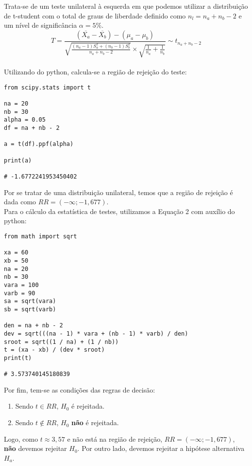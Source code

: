 Trata-se de um teste unilateral à esquerda em que podemos utilizar a distribuição de t-student com o total de graus de liberdade definido como $n_l=n_a+n_b-2$ e um nível de significância $\alpha=5\%$.\\

\begin{equation}
    T = \frac{(\overbar{X_a}-\overbar{X_b})-(\mu_a-\mu_b)}{
    \sqrt{\frac{(n_a-1)S^2_{a}+(n_b-1)S^2_{b}}{n_a+n_b-2}}
    \times
    \sqrt{\frac{1}{n_a}+\frac{1}{n_b}}
    }
    \sim t_{n_a+n_b-2}
\end{equation}
\\

Utilizando do python, calcula-se a região de rejeição do teste:
\\

\begin{lstlisting}
from scipy.stats import t

na = 20
nb = 30
alpha = 0.05
df = na + nb - 2
    
a = t(df).ppf(alpha)
    
print(a)
    
# -1.6772241953450402
\end{lstlisting}

Por se tratar de uma distribuição unilateral, temos que a região de rejeição é dada como $RR = (-\infty; -1,677)$.\\

Para o cálculo da estatística de testes, utilizamos a Equação 2 com auxílio do python:\\

\begin{lstlisting}
from math import sqrt

xa = 60
xb = 50
na = 20
nb = 30
vara = 100
varb = 90
sa = sqrt(vara)
sb = sqrt(varb)
    
den = na + nb - 2
dev = sqrt(((na - 1) * vara + (nb - 1) * varb) / den)
sroot = sqrt((1 / na) + (1 / nb))
t = (xa - xb) / (dev * sroot)
print(t)
    
# 3.573740145180839
\end{lstlisting}

Por fim, tem-se as condições das regras de decisão:

\begin{enumerate}
    \item Sendo $t\in RR$, $H_0$ é rejeitada.
    \item Sendo $t\notin RR$, $H_0$ \textbf{não} é rejeitada.
\end{enumerate}

Logo, como $t\approx 3,57$ e não está na região de rejeição, $RR = (-\infty; -1,677)$, \textcolor{COLOR2}{\textbf{não} devemos rejeitar $H_0$}. Por outro lado, \textcolor{COLOR2}{devemos rejeitar a hipótese alternativa $H_a$}.\\